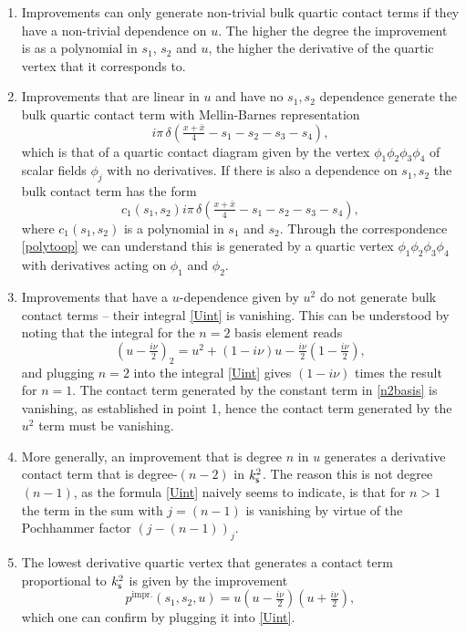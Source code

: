 \documentclass[11pt,a4paper]{article}
\begin{document}
\begin{enumerate}
\item Improvements can only generate non-trivial bulk quartic contact terms if they have a non-trivial dependence on $u$. The higher the degree the improvement is as a polynomial in $s_1$, $s_2$ and $u$, the higher the derivative of the quartic vertex that it corresponds to.

\item Improvements that are linear in $u$ and have no $s_1, s_2$ dependence generate the bulk quartic contact term with Mellin-Barnes representation
\begin{equation}
 i \pi\, \delta\left(\tfrac{x+\bar{x}}4-s_1-s_2-s_3-s_4\right),
\end{equation}
which is that of a quartic contact diagram given by the vertex $\phi_1\phi_2\phi_3\phi_4$ of scalar fields $\phi_j$ with no derivatives. If there is also a dependence on $s_1, s_2$ the bulk contact term has the form
\begin{equation}
        c_{1}\left(s_1,s_2\right)i \pi\,\delta\left(\tfrac{x+\bar{x}}4-s_1-s_2-s_3-s_4\right),
    \end{equation}
    where $c_{1}\left(s_1,s_2\right)$ is a polynomial in $s_1$ and $s_2$. Through the correspondence \eqref{polytoop} we can understand this is generated by a quartic vertex $\phi_1\phi_2\phi_3\phi_4$ with derivatives acting on $\phi_1$ and $\phi_2$.

    \item Improvements that have a $u$-dependence given by $u^2$ do not generate bulk contact terms -- their integral \eqref{Uint} is vanishing. This can be understood by noting that the integral for the $n=2$ basis element reads
    \begin{equation}\label{n2basis}
        \left(u-\tfrac{i\nu}{2}\right)_2=u^2+\left(1-i\nu\right) u -\tfrac{i\nu}{2}\left(1-\tfrac{i\nu}{2}\right),
    \end{equation}
    and plugging $n=2$ into the integral \eqref{Uint} gives $\left(1-i\nu\right)$ times the result for $n=1$. The contact term generated by the constant term in \eqref{n2basis} is vanishing, as established in point 1, hence the contact term generated by the $u^2$ term must be vanishing.
\item More generally, an improvement that is degree $n$ in $u$ generates a derivative contact term that is degree-$\left(n-2\right)$ in $k^2_{{\sf s}}$. The reason this is not degree $\left(n-1\right)$, as the formula \eqref{Uint} naively seems to indicate, is that for $n>1$ the term in the sum with $j=\left(n-1\right)$ is vanishing by virtue of the Pochhammer factor $\left(j-\left(n-1\right)\right)_j$. 

\item The lowest derivative quartic vertex that generates a contact term proportional to $k^2_{{\sf s}}$ is given by the improvement
\begin{equation}
     p^{\text{impr.}}\left(s_1,s_2,u\right) = u\left(u-\tfrac{i\nu}{2}\right)\left(u+\tfrac{i\nu}{2}\right),
\end{equation}
which one can confirm by plugging it into \eqref{Uint}.

\end{enumerate}
\end{document}
